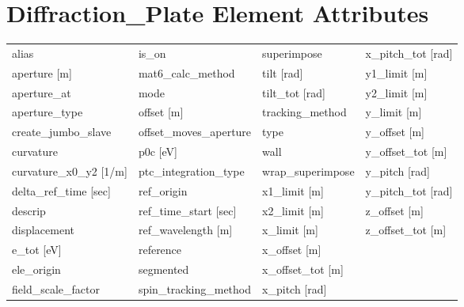  \section{Diffraction_Plate Element Attributes}
 \label{s:list.diffraction.plate}
 
 \begin{tabular}{llll} \toprule
alias                            & is_on                            & superimpose                      & x_pitch_tot [rad]                \\
aperture [m]                     & mat6_calc_method                 & tilt [rad]                       & y1_limit [m]                     \\
aperture_at                      & mode                             & tilt_tot [rad]                   & y2_limit [m]                     \\
aperture_type                    & offset [m]                       & tracking_method                  & y_limit [m]                      \\
create_jumbo_slave               & offset_moves_aperture            & type                             & y_offset [m]                     \\
curvature                        & p0c [eV]                         & wall                             & y_offset_tot [m]                 \\
curvature_x0_y2 [1/m]            & ptc_integration_type             & wrap_superimpose                 & y_pitch [rad]                    \\
delta_ref_time [sec]             & ref_origin                       & x1_limit [m]                     & y_pitch_tot [rad]                \\
descrip                          & ref_time_start [sec]             & x2_limit [m]                     & z_offset [m]                     \\
displacement                     & ref_wavelength [m]               & x_limit [m]                      & z_offset_tot [m]                 \\
e_tot [eV]                       & reference                        & x_offset [m]                     &                                  \\
ele_origin                       & segmented                        & x_offset_tot [m]                 &                                  \\
field_scale_factor               & spin_tracking_method             & x_pitch [rad]                    &                                  \\
 \bottomrule
 \end{tabular}
 \vfill
 

